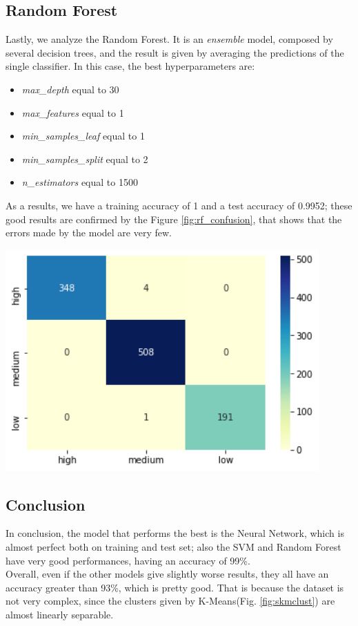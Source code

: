 \subsection{Random Forest}
\begin{minipage}{0.59\textwidth}
Lastly, we analyze the Random Forest. It is an \emph{ensemble} model, composed by several decision trees, and the result is given by averaging the predictions of the single classifier.
In this case, the best hyperparameters are:
\begin{itemize}
\item \emph{max\_depth} equal to 30
\item \emph{max\_features} equal to 1
\item \emph{min\_samples\_leaf} equal to 1
\item \emph{min\_samples\_split} equal to 2
\item \emph{n\_estimators} equal to 1500
\end{itemize}
As a results, we have a training accuracy of 1 and a test accuracy of 0.9952; these good results are confirmed by the Figure \ref{fig:rf_confusion}, that shows that the errors made by the model are very few.
\end{minipage}
\begin{minipage}{0.4\textwidth}
\centering
\includegraphics[width=0.90\textwidth]{img/classification/rf_confusion.png}
\captionsetup{justification=centering}
\label{fig:rf_confusion}
\end{minipage}

\subsection{Conclusion}
In conclusion, the model that performs the best is the Neural Network, which is almost perfect both on training and test set; also the SVM and Random Forest have very good performances, having an accuracy of 99\%.\\
Overall, even if the other models give slightly worse results, they all have an accuracy greater than 93\%, which is pretty good. That is because the dataset is not very complex, since the clusters given by K-Means(Fig. \ref{fig:skmclust}) are almost linearly separable.
